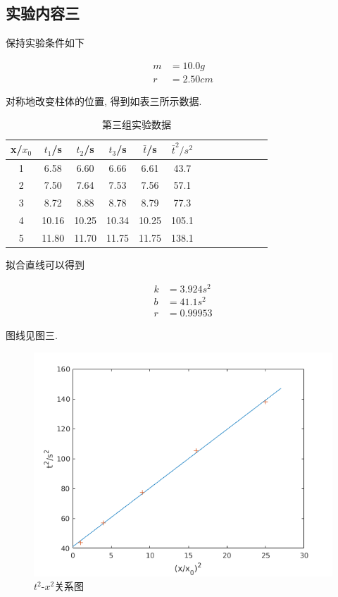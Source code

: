 \documentclass[a4paper,12pt,notitlepage]{article}
\begin{document}
\subsection{实验内容三}

	保持实验条件如下
	
\begin{align*}
	m &= 10.0g \\
	r &= 2.50 cm
\end{align*}

	对称地改变柱体的位置, 得到如表三所示数据. \\
	
\begin{center}
	\begin{longtable}{|c|c|c|c|c|c|c|c|c|c|c|c|c|}

	\caption{第三组实验数据}	\\
	\hline
	x/$x_0$ & $t_1$/s & $t_2$/s & $t_3$/s & $\bar{t}$/s & $\bar{t}^2/s^2$ \\
	\hline
	1 & 6.58 & 6.60 & 6.66 & 6.61 & 43.7 \\
	\hline
	2 & 7.50 & 7.64 & 7.53 & 7.56 & 57.1 \\
	\hline
	3 & 8.72 & 8.88 & 8.78 & 8.79 & 77.3 \\
	\hline
	4 & 10.16 & 10.25 & 10.34 & 10.25 & 105.1 \\
	\hline
	5 & 11.80 & 11.70 & 11.75 & 11.75 & 138.1 \\
	\hline

	\end{longtable}
\end{center}

	拟合直线可以得到
	
\begin{align*}
	k &= 3.924 s^2 \\
	b &= 41.1 s^2 \\
	r &= 0.99953
\end{align*}

	图线见图三. \\
	
\begin{figure}[h]
\centering
	\includegraphics[scale=0.7]{figure_3.png}
	\caption{$t^2$-$x^2$关系图}
\end{figure}
\end{document}
